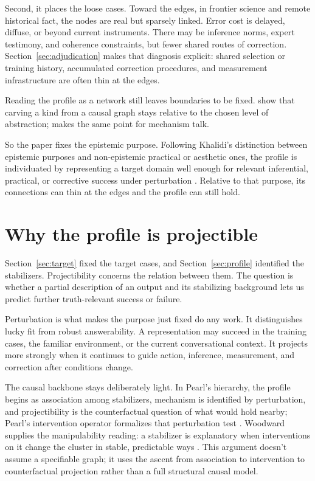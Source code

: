 \documentclass[12pt]{article}
\begin{document}
Second, it places the loose cases. Toward the edges, in frontier science and remote
historical fact, the nodes are real but sparsely linked. Error cost is delayed, diffuse, or
beyond current instruments. There may be inference norms, expert testimony, and coherence
constraints, but fewer shared routes of correction. Section~\ref{sec:adjudication} makes that diagnosis explicit:
shared selection or training history, accumulated correction procedures, and measurement
infrastructure
are often thin at the edges.

Reading the profile as a network still leaves boundaries to be fixed.
\textcite{onishi_serpico_2022} show that carving a kind from a causal graph stays
relative to the chosen level of abstraction; \textcite{craver_2009} makes the same point
for mechanism talk.

So the paper fixes the epistemic purpose. Following Khalidi's distinction between
epistemic purposes and non-epistemic practical or aesthetic ones, the profile is
individuated by representing a target domain well enough for relevant inferential,
practical, or corrective success under perturbation \citep{khalidi2013}. Relative to
that purpose, its connections can thin at the edges and the profile can still hold.

\section{Why the profile is projectible}\label{sec:projectibility}

Section~\ref{sec:target} fixed the target cases, and Section~\ref{sec:profile}
identified the stabilizers. Projectibility concerns the relation between them. The
question is whether a partial description of an output and its stabilizing background
lets us predict further truth-relevant success or failure.

Perturbation is what makes the purpose just fixed do any work. It distinguishes lucky fit
from robust answerability. A representation may
succeed in the training cases, the familiar environment, or the current conversational
context. It projects more strongly when it continues to guide action, inference,
measurement, and correction after conditions change.

The causal backbone stays deliberately light. In Pearl's hierarchy, the profile begins
as association among stabilizers, mechanism is identified by perturbation, and
projectibility is the counterfactual question of what would hold nearby; Pearl's
intervention operator formalizes that perturbation test
\citep{pearl2009,pearl2010foundations}. Woodward supplies the manipulability reading: a
stabilizer is explanatory when interventions on it change the cluster in stable,
predictable ways \citep{woodward2003MakingThingsHappen,woodward2001}. This
argument doesn't assume a specifiable graph; it uses the ascent from
association to intervention to counterfactual projection rather than a full structural
causal model.
\end{document}
